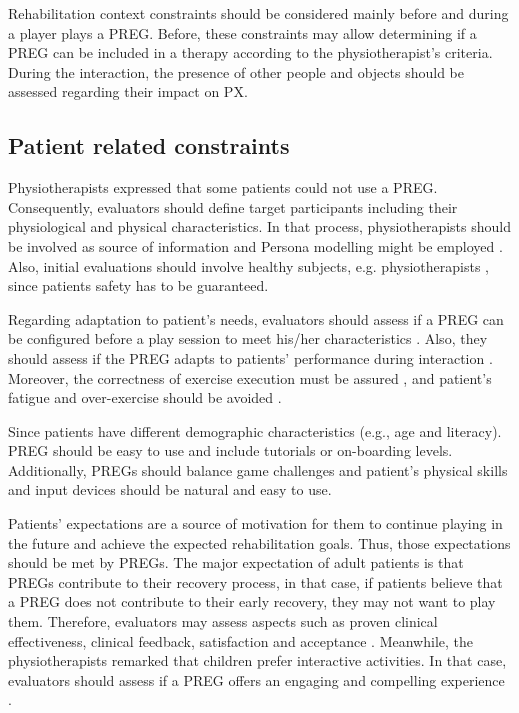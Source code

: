 Rehabilitation context constraints should be considered mainly before and during a player plays a \ac{PREG}. Before, these constraints may allow determining if a \ac{PREG} can be included in a therapy according to the physiotherapist's criteria. During the interaction, the presence of other people and objects should be assessed regarding their impact on \ac{PX}.

\subsection{Patient related constraints}
Physiotherapists expressed that some patients could not use a \ac{PREG}. Consequently, evaluators should define target participants including their physiological and physical characteristics. In that process, physiotherapists should be involved as source of information and Persona modelling might be employed \autocite{Mader2012}. Also, initial evaluations should involve healthy subjects, e.g. physiotherapists \autocite{Chu2011}, since patients safety has to be guaranteed.

Regarding adaptation to patient's needs, evaluators should assess if a \ac{PREG} can be configured before a play session to meet his/her characteristics \autocite{Ni2014,Nijholt2008,PirovanoAdvisor2012,Rego2018,Sinclair2007,Wiemeyer2015}. Also, they should assess if the \ac{PREG} adapts to patients' performance during interaction \autocite{PirovanoAdvisor2012,Rego2018}. Moreover, the correctness of exercise execution must be assured \autocite{Isbister2015,PirovanoAdvisor2012}, and patient's fatigue and over-exercise should be avoided \autocite{Isbister2015,Pasch2009,Zhang2011}.

Since patients have different demographic characteristics (e.g., age and literacy). \acs{PREG} should be easy to use and include tutorials or on-boarding levels. Additionally, \acp{PREG} should balance game challenges and patient's physical skills \autocite{Sinclair2007} and input devices should be natural and easy to use.

Patients' expectations are a source of motivation for them to continue playing in the future and achieve the expected rehabilitation goals. Thus, those expectations should be met by \acp{PREG}. The major expectation of adult patients is that \acp{PREG} contribute to their recovery process, in that case, if patients believe that a \ac{PREG} does not contribute to their early recovery, they may not want to play them. Therefore, evaluators may assess aspects such as proven clinical effectiveness, clinical feedback, \autocite{Seo2016} satisfaction \autocite{Sanchez2009,Yanez-Gomez2017,Zhao2016} and acceptance \autocite{Yanez-Gomez2017}. Meanwhile, the physiotherapists remarked that children prefer interactive activities. In that case, evaluators should assess if a \ac{PREG} offers an engaging and compelling experience \autocite{PirovanoAdvisor2012,Sinclair2007}.

